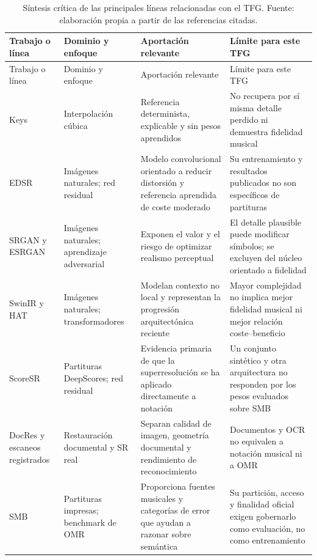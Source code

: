\setlength{\tabcolsep}{3pt}
\begin{longtable}{p{}p{}p{}p{}}
  \caption{Síntesis crítica de las principales líneas relacionadas con el TFG. Fuente:
  elaboración propia a partir de las referencias citadas.}
  \label{tab:sota-synthesis} \\
  \toprule
  Trabajo o línea & Dominio y enfoque & Aportación relevante & Límite para este TFG \\
  \midrule
  \endfirsthead
  \toprule
  Trabajo o línea & Dominio y enfoque & Aportación relevante & Límite para este TFG \\
  \midrule
  \endhead
  Keys \cite{keys1981cubic} & Interpolación cúbica & Referencia determinista, explicable y sin pesos aprendidos & No recupera por sí misma detalle perdido ni demuestra fidelidad musical \\
  EDSR \cite{lim2017edsr} & Imágenes naturales; red residual & Modelo convolucional orientado a reducir distorsión y referencia aprendida de coste moderado & Su entrenamiento y resultados publicados no son específicos de partituras \\
  SRGAN y ESRGAN \cite{ledig2017srgan,wang2018esrgan} & Imágenes naturales; aprendizaje adversarial & Exponen el valor y el riesgo de optimizar realismo perceptual & El detalle plausible puede modificar símbolos; se excluyen del núcleo orientado a fidelidad \\
  SwinIR y HAT \cite{liang2021swinir,chen2023hat} & Imágenes naturales; transformadores & Modelan contexto no local y representan la progresión arquitectónica reciente & Mayor complejidad no implica mejor fidelidad musical ni mejor relación coste--beneficio \\
  ScoreSR \cite{tran2019scoresr} & Partituras DeepScores; red residual & Evidencia primaria de que la superresolución se ha aplicado directamente a notación & Un conjunto sintético y otra arquitectura no responden por los pesos evaluados sobre SMB \\
  DocRes y escaneos registrados \cite{zhang2024docres,zyrek2025document} & Restauración documental y SR real & Separan calidad de imagen, geometría documental y rendimiento de reconocimiento & Documentos y OCR no equivalen a notación musical ni a OMR \\
  SMB \cite{martinez2025smb} & Partituras impresas; benchmark de OMR & Proporciona fuentes musicales y categorías de error que ayudan a razonar sobre semántica & Su partición, acceso y finalidad oficial exigen gobernarlo como evaluación, no como entrenamiento \\
  \bottomrule
\end{longtable}
\setlength{\tabcolsep}{6pt}

